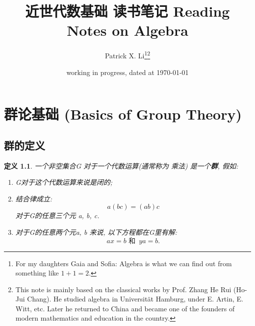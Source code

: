 \documentclass[utf8]{ctexbook}
\newtheorem{definition}{定义}[section]
\begin{document}
\title{近世代数基础 读书笔记 Reading Notes on Algebra}
\author{Patrick X. Li\thanks{For my daughters Gaia and Sofia: Algebra is what we can find out from something like $1+1=2$.}\thanks{This note is mainly based on the classical works by Prof. Zhang He Rui (Ho-Jui Chang). He studied algebra in Universit\"at Hamburg, under E. Artin, E. Witt, etc. Later he returned to China and became one of the founders of modern mathematics and education in the country.}}



\date{working in progress, dated at \today}
\maketitle



\newpage
\tableofcontents

\newpage

\chapter{群论基础 (Basics of Group Theory)}

\section{群的定义}

\begin{definition}\label{def_group_1}
一个非空集合G 对于一个代数运算(通常称为 乘法) 是一个\textbf{群}, 假如:
\begin{enumerate}
\item[I.]{G对于这个代数运算来说是闭的;}
\item[II.]{结合律成立:
	\begin{equation}
		a(bc) = (ab) c 	
	\end{equation}
对于G的任意三个元 a, b, c.}

\item[III.]{对于G的任意两个元a, b 来说, 以下方程都在G里有解:
\begin{equation}
ax = b \mbox{ 和 } \, y a = b.
\end{equation}
}
\end{enumerate}
\end{definition}
\end{document}
